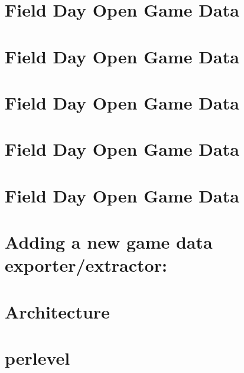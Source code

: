 \let\mypdfximage\pdfximage\def\pdfximage{\immediate\mypdfximage}\documentclass[twoside]{book}
\newcommand{\+}{\discretionary{\mbox{\scriptsize$\hookleftarrow$}}{}{}}
\begin{document}
\chapter{Field Day Open Game Data}
\label{md_data__c_r_y_s_t_a_l_readme}

\chapter{Field Day Open Game Data}
\label{md_data__j_o_w_i_l_d_e_r__j_o_w_i_l_d_e_r_20191101_to_20191130_readme}

\chapter{Field Day Open Game Data}
\label{md_data__j_o_w_i_l_d_e_r__j_o_w_i_l_d_e_r_20191210_to_20191217_readme}

\chapter{Field Day Open Game Data}
\label{md_data__j_o_w_i_l_d_e_r_readme}

\chapter{Field Day Open Game Data}
\label{md_data__w_a_v_e_s_readme}

\chapter{Adding a new game data exporter/extractor\+:}
\label{md_doc__adding_a__game}

\chapter{Architecture}
\label{md_doc__architecture}

\chapter{perlevel}
\label{md_doc__lakeland__features}

\end{document}
